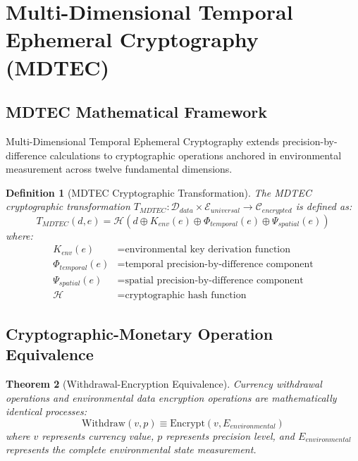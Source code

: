 \documentclass[12pt,a4paper]{article}
\newtheorem{theorem}{Theorem}
\newtheorem{definition}[theorem]{Definition}
\begin{document}
\section{Multi-Dimensional Temporal Ephemeral Cryptography (MDTEC)}

\subsection{MDTEC Mathematical Framework}

Multi-Dimensional Temporal Ephemeral Cryptography extends precision-by-difference calculations to cryptographic operations anchored in environmental measurement across twelve fundamental dimensions.

\begin{definition}[MDTEC Cryptographic Transformation]
The MDTEC cryptographic transformation $T_{MDTEC}: \mathcal{D}_{data} \times \mathcal{E}_{universal} \to \mathcal{C}_{encrypted}$ is defined as:
\begin{equation}
T_{MDTEC}(d, e) = \mathcal{H}(d \oplus K_{env}(e) \oplus \Phi_{temporal}(e) \oplus \Psi_{spatial}(e))
\end{equation}
where:
\begin{align}
K_{env}(e) &= \text{environmental key derivation function} \\
\Phi_{temporal}(e) &= \text{temporal precision-by-difference component} \\
\Psi_{spatial}(e) &= \text{spatial precision-by-difference component} \\
\mathcal{H} &= \text{cryptographic hash function}
\end{align}
\end{definition}

\subsection{Cryptographic-Monetary Operation Equivalence}

\begin{theorem}[Withdrawal-Encryption Equivalence]
Currency withdrawal operations and environmental data encryption operations are mathematically identical processes:
\begin{equation}
\text{Withdraw}(v, p) \equiv \text{Encrypt}(v, E_{environmental})
\end{equation}
where $v$ represents currency value, $p$ represents precision level, and $E_{environmental}$ represents the complete environmental state measurement.
\end{theorem}
\end{document}
